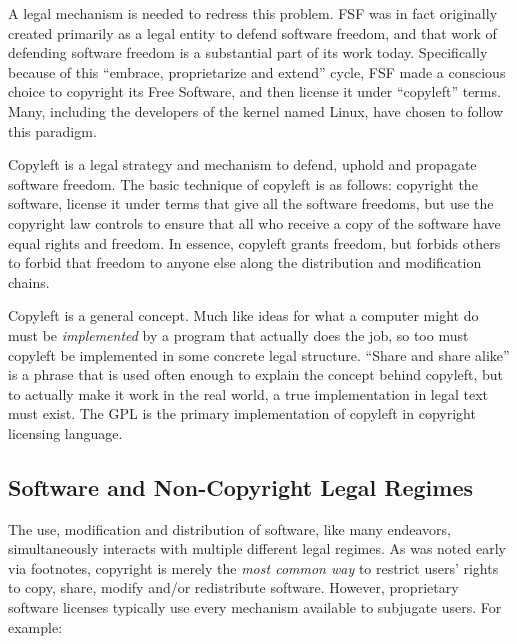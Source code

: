 A legal mechanism is needed to redress this problem. FSF was in fact
originally created primarily as a legal entity to defend software freedom,
and that work of defending software freedom is a substantial part of
its work today. Specifically because of this ``embrace, proprietarize and
extend'' cycle, FSF made a conscious choice to copyright its Free Software,
and then license it under ``copyleft'' terms. Many, including the
developers of the kernel named Linux, have chosen to follow this paradigm.

\label{copyleft-definition}

Copyleft is a legal strategy and mechanism to defend, uphold and propagate software
freedom. The basic technique of copyleft is as follows: copyright the
software, license it under terms that give all the software freedoms, but
use the copyright law controls to ensure that all who receive a copy of
the software have equal rights and freedom. In essence, copyleft grants
freedom, but forbids others to forbid that freedom to anyone else along
the distribution and modification chains.

Copyleft is a general concept. Much like ideas for what a computer might
do must be \emph{implemented} by a program that actually does the job, so
too must copyleft be implemented in some concrete legal structure.
``Share and share alike'' is a phrase that is used often enough to explain the
concept behind copyleft, but to actually make it work in the real world, a
true implementation in legal text must exist. The GPL is the primary
implementation of copyleft in copyright licensing language.

\subsection{Software and Non-Copyright Legal Regimes}
\label{software-and-non-copyright}

The use, modification and distribution of software, like many endeavors,
simultaneously interacts with multiple different legal regimes.  As was noted
early via footnotes, copyright is merely the \textit{most common way} to
restrict users' rights to copy, share, modify and/or redistribute software.
However, proprietary software licenses typically use every mechanism
available to subjugate users.  For example:

